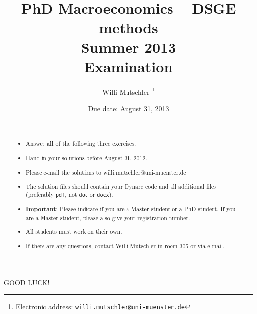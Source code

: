\documentclass[10pt,a4paper]{article}
\begin{document}
\title{PhD Macroeconomics -- DSGE methods\\ Summer 2013\\ Examination}
\author{Willi Mutschler%
  \thanks{Electronic address: \texttt{willi.mutschler@uni-muenster.de}}}
\date{Due date: August 31, 2013}
\maketitle
\thispagestyle{empty}

\renewcommand\abstractname{~}
\begin{abstract}~
\begin{itemize}
\item Answer \textbf{all} of the following three exercises.
\item Hand in your solutions before August 31, 2012.
\item Please e-mail the solutions to willi.mutschler@uni-muenster.de
\item The solution files should contain your Dynare code and all
additional files \newline
(preferably \texttt{pdf}, not \texttt{doc} or \texttt{docx}).
\item \textbf{Important}: Please indicate if you are a Master student or a
PhD student. If you are a Master student, please also give your registration
number.
\item All students must work on their own.
\item If there are any questions, contact Willi Mutschler in room 305 or via e-mail.
\end{itemize}
\end{abstract}

\begin{center}\Huge{GOOD LUCK!}\end{center}\normalsize
\newpage \setcounter{page}{1}
\end{document}
